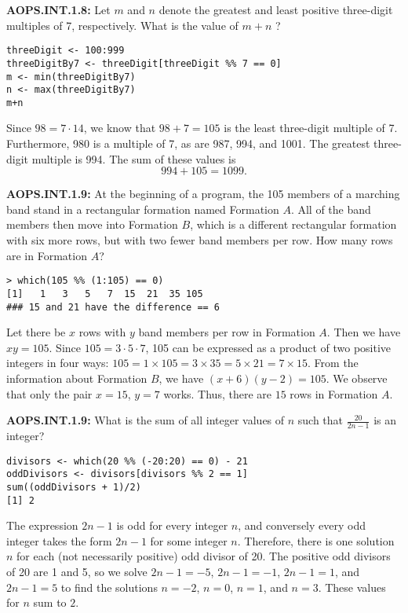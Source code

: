 \documentclass[11pt]{article}
\newenvironment{uzdevums}[1][\unskip]{%
\vspace{3mm}
\noindent
\textbf{#1:}
\noindent}
{}
\begin{document}
\begin{uzdevums}[AOPS.INT.1.8]
Let $m$ and $n$ denote the greatest and least positive three-digit multiples of 7, respectively. What is the value of $m + n$ ?
\end{uzdevums}

\begin{verbatim}
threeDigit <- 100:999
threeDigitBy7 <- threeDigit[threeDigit %% 7 == 0]
m <- min(threeDigitBy7)
n <- max(threeDigitBy7)
m+n
\end{verbatim}

Since $98=7\cdot14$, we know that $98+7=105$ is the least three-digit multiple of 7. Furthermore, 980 is a multiple of 7, as are 987, 994, and 1001. The greatest three-digit multiple is 994. The sum of these values is \[994+105=\boxed{1099}.\]


\begin{uzdevums}[AOPS.INT.1.9]
At the beginning of a program, the 105 members of a marching band stand in a rectangular formation named Formation $A$. All of the band members then move into Formation $B$, which is a different rectangular formation with six more rows, but with two fewer band members per row. How many rows are in Formation $A$?
\end{uzdevums}


\begin{verbatim}
> which(105 %% (1:105) == 0)
[1]   1   3   5   7  15  21  35 105
### 15 and 21 have the difference == 6
\end{verbatim}

Let there be $x$ rows with $y$ band members per row in Formation $A$. Then we have $xy=105$. Since $105=3\cdot5\cdot7$, 105 can be expressed as a product of two positive integers in four ways: $105=1\times105=3\times35=5\times21=7\times15$. From the information about Formation $B$, we have $(x+6)(y-2)=105$. We observe that only the pair $x=15$, $y=7$ works. Thus, there are $\boxed{15}$ rows in Formation $A$.

\begin{uzdevums}[AOPS.INT.1.9]
What is the sum of all integer values of $n$ such that $\frac{20}{2n - 1}$ is an integer?
\end{uzdevums}


\begin{verbatim}
divisors <- which(20 %% (-20:20) == 0) - 21
oddDivisors <- divisors[divisors %% 2 == 1]
sum((oddDivisors + 1)/2)
[1] 2
\end{verbatim}

The expression $2n-1$ is odd for every integer $n$, and conversely every odd integer takes the form $2n-1$ for some integer $n$. Therefore, there is one solution $n$ for each (not necessarily positive) odd divisor of 20. The positive odd divisors of 20 are 1 and 5, so we solve $2n-1=-5$, $2n-1=-1$, $2n-1=1$, and $2n-1=5$ to find the solutions $n=-2$, $n=0$, $n=1$, and $n=3$. These values for $n$ sum to $\boxed{2}$.
\end{document}

